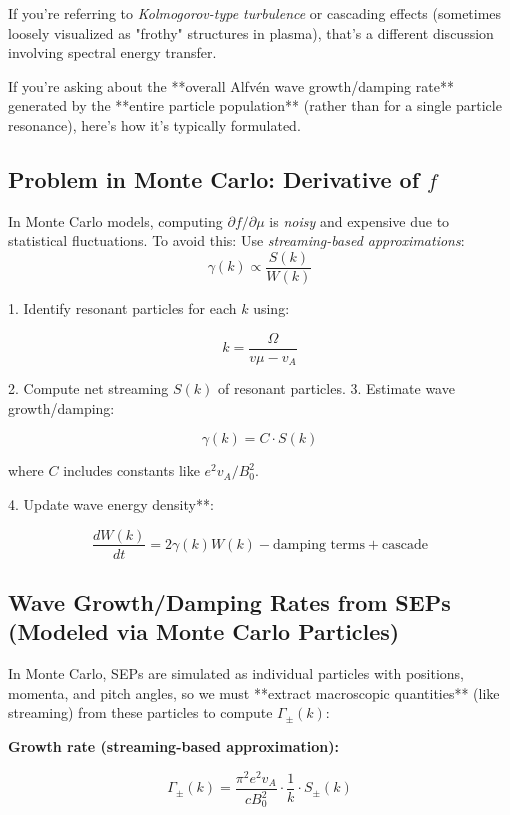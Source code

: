 If you’re referring to {\it Kolmogorov-type turbulence} or cascading effects (sometimes loosely visualized as "frothy" structures in plasma), that's a different discussion involving spectral energy transfer.

If you're asking about the **overall Alfvén wave growth/damping rate** generated by the **entire particle population** (rather than for a single particle resonance), here's how it's typically formulated.



\subsection{Problem in Monte Carlo: Derivative of $f$}

In Monte Carlo models, computing $\partial f / \partial \mu$ is {\it noisy} and expensive due to statistical fluctuations. To avoid this:
 Use {\it streaming-based approximations}:
$$
\gamma(k) \propto \frac{S(k)}{W(k)}
$$



1. Identify resonant particles for each $k$ using:

$$
k = \frac{\Omega}{v \mu - v_A}
$$

2. Compute net streaming $S(k)$ of resonant particles.
3. Estimate wave growth/damping:

$$
\gamma(k) = C \cdot S(k)
$$

where $C$ includes constants like $e^2 v_A / B_0^2$.

4. Update wave energy density**:

$$
\frac{dW(k)}{dt} = 2 \gamma(k) W(k) - \text{damping terms} + \text{cascade}
$$







\subsection{Wave Growth/Damping Rates from SEPs (Modeled via Monte Carlo Particles)}

In Monte Carlo, SEPs are simulated as individual particles with positions, momenta, and pitch angles, so we must **extract macroscopic quantities** (like streaming) from these particles to compute $\Gamma_\pm(k)$:

\textbf{Growth rate (streaming-based approximation):}

$$
\Gamma_\pm(k) = \frac{\pi^2 e^2 v_A}{c B_0^2} \cdot \frac{1}{k} \cdot S_\pm(k)
$$

